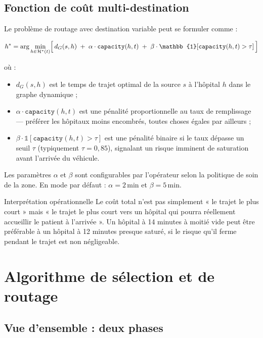 \documentclass[12pt,a4paper]{article}
\theoremstyle{definition}
\theoremstyle{remark}
\begin{document}
\subsection{Fonction de coût multi-destination}

Le problème de routage avec destination variable peut se formuler comme :

\[
  h^* = \arg\min_{h \in \mathcal{H}^*(t)}
  \Bigl[\,
    d_G(s, h)
    \;+\;
    \alpha \cdot \texttt{capacity}(h, t)
    \;+\;
    \beta \cdot \mathbb{1}[\texttt{capacity}(h,t) > \tau]
  \,\Bigr]
\]

où :
\begin{itemize}[leftmargin=1.5em]
  \item $d_G(s, h)$ est le temps de trajet optimal de la source $s$
    à l'hôpital $h$ dans le graphe dynamique ;
  \item $\alpha \cdot \texttt{capacity}(h, t)$ est une pénalité
    proportionnelle au taux de remplissage — préférer les hôpitaux
    moins encombrés, toutes choses égales par ailleurs ;
  \item $\beta \cdot \mathbb{1}[\texttt{capacity}(h,t) > \tau]$ est
    une pénalité binaire si le taux dépasse un seuil $\tau$ (typiquement
    $\tau = 0{,}85$), signalant un risque imminent de saturation avant
    l'arrivée du véhicule.
\end{itemize}

Les paramètres $\alpha$ et $\beta$ sont configurables par l'opérateur
selon la politique de soin de la zone. En mode par défaut :
$\alpha = 2\,\text{min}$ et $\beta = 5\,\text{min}$.

\begin{metierbox}{Interprétation opérationnelle}
Le coût total n'est pas simplement « le trajet le plus court » mais
« le trajet le plus court vers un hôpital qui pourra réellement
accueillir le patient à l'arrivée ». Un hôpital à 14 minutes à
moitié vide peut être préférable à un hôpital à 12 minutes presque
saturé, si le risque qu'il ferme pendant le trajet est non négligeable.
\end{metierbox}

\newpage

\section{Algorithme de sélection et de routage}

\subsection{Vue d'ensemble : deux phases}
\end{document}
